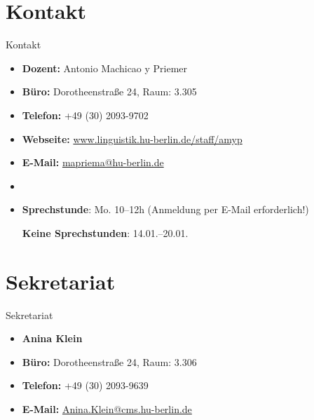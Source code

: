 \section{Kontakt}
%

\begin{frame}{Kontakt}

\begin{itemize}
	\item \textbf{Dozent:} Antonio Machicao y Priemer \textipa{[ma.\t{tS}i."ka.o."Pi."pKi:.m5]}
	\item \textbf{Büro:} Dorotheenstraße 24, Raum: 3.305
	\item \textbf{Telefon:} +49 (30) 2093-9702
	\item \textbf{Webseite:} \href{www.linguistik.hu-berlin.de/staff/amyp}{www.linguistik.hu-berlin.de/staff/amyp}
	\item \textbf{E-Mail:} \href{mailto:mapriema@hu-berlin.de}{mapriema@hu-berlin.de}
	\item[]
	\item \textbf{Sprechstunde}: Mo. 10--12h (Anmeldung per E-Mail erforderlich!)
	
	\textbf{Keine Sprechstunden}: 14.01.--20.01.
\end{itemize}	

\end{frame}


\section{Sekretariat}

\begin{frame}{Sekretariat}

\begin{itemize}
	\item[] \textbf{Anina Klein}	
	\item \textbf{Büro:} Dorotheenstraße 24, Raum: 3.306
	\item \textbf{Telefon:} +49 (30) 2093-9639
	\item \textbf{E-Mail:} \href{mailto:Anina.Klein@cms.hu-berlin.de}{Anina.Klein@cms.hu-berlin.de}
\end{itemize}	

\end{frame}


